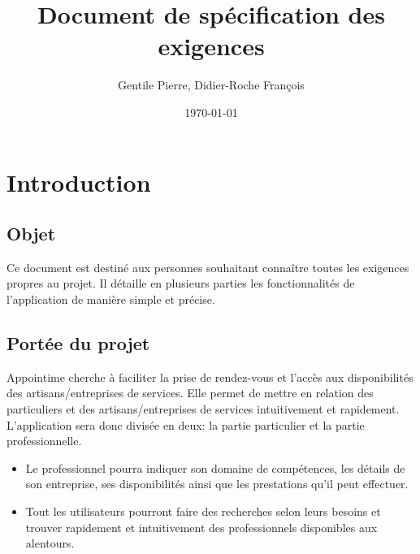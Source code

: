 \documentclass{article}
\author{Gentile Pierre, Didier-Roche François}
\date{\today}
\title{Document de spécification des exigences}
\begin{document}
\maketitle

\newpage
\tableofcontents
\newpage


\section{Introduction}
\subsection{Objet}
Ce document est destiné aux personnes souhaitant connaître toutes les exigences propres au projet. Il détaille en plusieurs parties 
les fonctionnalités de l'application de manière simple et précise. 
\subsection{Portée du projet}
Appointime cherche à faciliter la prise de rendez-vous et l’accès aux disponibilités des artisans/entreprises de services.
Elle permet de mettre en relation des particuliers et des artisans/entreprises de services intuitivement et rapidement.
L’application sera donc divisée en deux: la partie particulier et la partie professionnelle.
\begin{itemize}
\item Le professionnel pourra indiquer son domaine de compétences, les détails de son entreprise, ses disponibilités
ainsi que les prestations qu’il peut effectuer.
\item Tout les utilisateurs pourront faire des recherches selon leurs
  besoins et trouver rapidement et intuitivement des professionnels
  disponibles aux alentours.
\end{itemize}
\end{document}

